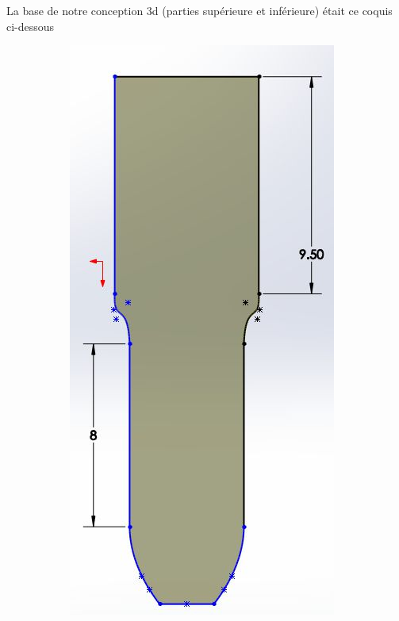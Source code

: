 La base de notre conception 3d (parties supérieure et inférieure) était ce coquis ci-dessous

\begin{figure}
    \begin{subfigure}[m]{.65\linewidth}
        \centering
        \includegraphics[width=\textwidth]{assets/conception1/img168.jpg}

\end{subfigure}
\end{figure}
